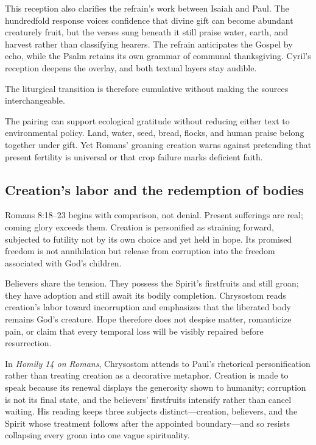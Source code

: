 This reception also clarifies the refrain's work between Isaiah and Paul. The hundredfold response voices confidence that divine gift can become abundant creaturely fruit, but the verses sung beneath it still praise water, earth, and harvest rather than classifying hearers. The refrain anticipates the Gospel by echo, while the Psalm retains its own grammar of communal thanksgiving. Cyril's reception deepens the overlay, and both textual layers stay audible.

The liturgical transition is therefore cumulative without making the sources interchangeable.

The pairing can support ecological gratitude without reducing either text to environmental policy. Land, water, seed, bread, flocks, and human praise belong together under gift. Yet Romans' groaning creation warns against pretending that present fertility is universal or that crop failure marks deficient faith.

\subsection*{Creation's labor and the redemption of bodies\enspace{}}

Romans 8:18--23 begins with comparison, not denial. Present sufferings are real; coming glory exceeds them. Creation is personified as straining forward, subjected to futility not by its own choice and yet held in hope. Its promised freedom is not annihilation but release from corruption into the freedom associated with God's children.

Believers share the tension. They possess the Spirit's firstfruits and still groan; they have adoption and still await its bodily completion. Chrysostom reads creation's labor toward incorruption and emphasizes that the liberated body remains God's creature. Hope therefore does not despise matter, romanticize pain, or claim that every temporal loss will be visibly repaired before resurrection.

In \emph{Homily 14 on Romans}, Chrysostom attends to Paul's rhetorical personification rather than treating creation as a decorative metaphor. Creation is made to speak because its renewal displays the generosity shown to humanity; corruption is not its final state, and the believers' firstfruits intensify rather than cancel waiting. His reading keeps three subjects distinct---creation, believers, and the Spirit whose treatment follows after the appointed boundary---and so resists collapsing every groan into one vague spirituality.

